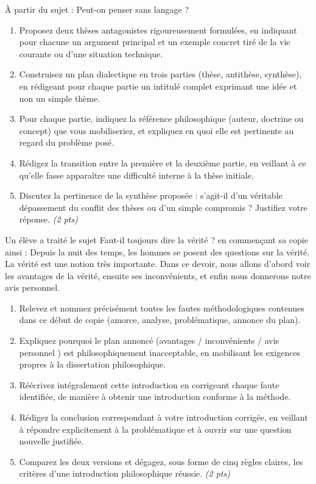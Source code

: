 \documentclass[11pt]{article}
\begin{document}
\begin{exercice}
À partir du sujet : \og Peut-on penser sans langage ? \fg
\begin{enumerate}
\item Proposez deux thèses antagonistes rigoureusement formulées, en indiquant pour chacune un argument principal et un exemple concret tiré de la vie courante ou d'une situation technique.
\item Construisez un plan dialectique en trois parties (thèse, antithèse, synthèse), en rédigeant pour chaque partie un intitulé complet exprimant une idée et non un simple thème.
\item Pour chaque partie, indiquez la référence philosophique (auteur, doctrine ou concept) que vous mobiliseriez, et expliquez en quoi elle est pertinente au regard du problème posé.
\item Rédigez la transition entre la première et la deuxième partie, en veillant à ce qu'elle fasse apparaître une difficulté interne à la thèse initiale.
\item Discutez la pertinence de la synthèse proposée : s'agit-il d'un véritable dépassement du conflit des thèses ou d'un simple compromis ? Justifiez votre réponse. \emph{(2 pts)}
\end{enumerate}
\end{exercice}

\begin{exercice}
Un élève a traité le sujet \og Faut-il toujours dire la vérité ? \fg en commençant sa copie ainsi : \og Depuis la nuit des temps, les hommes se posent des questions sur la vérité. La vérité est une notion très importante. Dans ce devoir, nous allons d'abord voir les avantages de la vérité, ensuite ses inconvénients, et enfin nous donnerons notre avis personnel. \fg
\begin{enumerate}
\item Relevez et nommez précisément toutes les fautes méthodologiques contenues dans ce début de copie (amorce, analyse, problématique, annonce du plan).
\item Expliquez pourquoi le plan annoncé (\og avantages / inconvénients / avis personnel \fg) est philosophiquement inacceptable, en mobilisant les exigences propres à la dissertation philosophique.
\item Réécrivez intégralement cette introduction en corrigeant chaque faute identifiée, de manière à obtenir une introduction conforme à la méthode.
\item Rédigez la conclusion correspondant à votre introduction corrigée, en veillant à répondre explicitement à la problématique et à ouvrir sur une question nouvelle justifiée.
\item Comparez les deux versions et dégagez, sous forme de cinq règles claires, les critères d'une introduction philosophique réussie. \emph{(2 pts)}
\end{enumerate}
\end{exercice}
\end{document}
